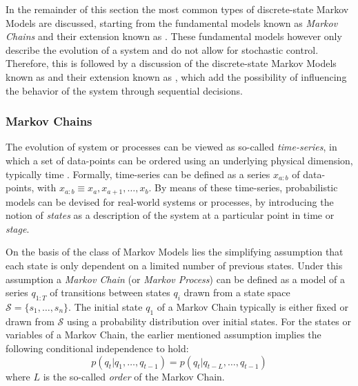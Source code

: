 In the remainder of this section the most common types of discrete-state Markov Models are discussed, starting from the fundamental models known as \textit{Markov Chains} and their extension known as \textit{}.
These fundamental models however only describe the evolution of a system and do not allow for stochastic control.
Therefore, this is followed by a discussion of the discrete-state Markov Models known as \textit{} and their extension known as \textit{}, which add the possibility of influencing the behavior of the system through sequential decisions.


\newpage

\subsubsection{Markov Chains}
\label{sec:markov-chains}

The evolution of system or processes can be viewed as so-called \textit{time-series}, in which a set of data-points can be ordered using an underlying physical dimension, typically time \cite{barberBRML2012}.
Formally, time-series can be defined as a series $x_{a:b}$ of data-points, with $x_{a:b} \equiv x_a, x_{a+1}, \ldots, x_b$.
By means of these time-series, probabilistic models can be devised for real-world systems or processes, by introducing the notion of \textit{states} as a description of the system at a particular point in time or \textit{stage}.

On the basis of the class of Markov Models lies the simplifying assumption that each state is only dependent on a limited number of previous states.
Under this assumption a \textit{Markov Chain} (or \textit{Markov Process}) can be defined as a model of a series $q_{1:T}$ of transitions between states $q_i$ drawn from a state space $\mathcal{S} = \{s_1,\ldots,s_n\}$. The initial state $q_1$ of a Markov Chain typically is either fixed or drawn from $\mathcal{S}$ using a probability distribution over initial states.
For the states or variables of a Markov Chain, the earlier mentioned assumption implies the following conditional independence to hold:
\begin{equation}
p(q_t \vert q_1,\ldots,q_{t-1}) = p(q_t \vert q_{t - L}, \ldots, q_{t-1})
\end{equation}
where $L$ is the so-called \textit{order} of the Markov Chain.

